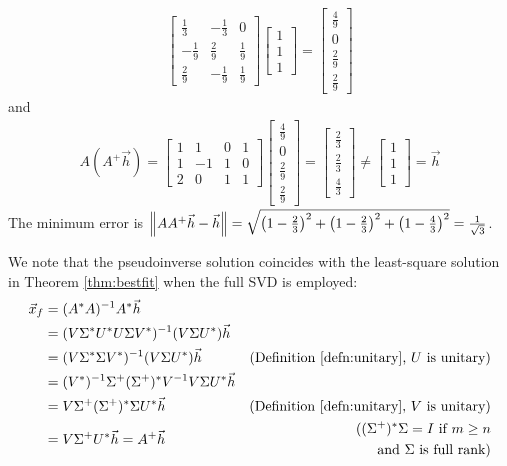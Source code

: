 \begin{solution}
\begin{align*}
\begin{bmatrix}
\frac{1}{3}&-\frac{1}{3}&0\\ 
-\frac{1}{9}&\frac{2}{9}&\frac{1}{9}\\ 
\frac{2}{9}&-\frac{1}{9}&\frac{1}{9}
\end{bmatrix}
\begin{bmatrix}
1 \\
1 \\
1
\end{bmatrix}  
=
\begin{bmatrix}
\frac{4}{9}\\ 
0\\ 
\frac{2}{9}\\ 
\frac{2}{9}
\end{bmatrix}
\end{align*}
and
\begin{align*}
A(A^+\vec{h}) = 
\begin{bmatrix}
1&1&0&1\\ 
1&-1&1&0\\ 
2&0&1&1
\end{bmatrix}
\begin{bmatrix}
\frac{4}{9}\\ 
0\\ 
\frac{2}{9}\\ 
\frac{2}{9}
\end{bmatrix}
=
\begin{bmatrix}
\frac{2}{3} \\
\frac{2}{3} \\
\frac{4}{3}
\end{bmatrix}
\neq 
\begin{bmatrix}
1 \\
1 \\
1
\end{bmatrix} 
= \vec{h}
\end{align*}
The minimum error is $\norm{AA^+\vec{h} - \vec{h}} = \sqrt{\left(1-\frac{2}{3}\right)^2 + \left(1-\frac{2}{3}\right)^2 + \left(1-\frac{4}{3}\right)^2} = \frac{1}{\sqrt{3}}$.
\end{solution}
We note that the pseudoinverse solution coincides with the least-square solution in Theorem \ref{thm:bestfit} when the full SVD is employed:
\begin{align*}
\vec{x}_f &= (A^* A)^{-1}A^* \vec{h} \\
&= (V \Sigma^* U^* U\Sigma V^*)^{-1} (V \Sigma U^*) \vec{h} \\
&= (V \Sigma^* \Sigma V^*)^{-1} (V \Sigma U^*) \vec{h} & \text{(Definition \ref{defn:unitary}, $U$ is unitary)} \\
&= (V^*)^{-1} \Sigma^+ (\Sigma^+)^* V^{-1} V \Sigma U^* \vec{h} \\
&= V \Sigma^+ (\Sigma^+)^* \Sigma U^* \vec{h} & \text{(Definition \ref{defn:unitary}, $V$ is unitary)} \\
&= V {\Sigma^+} U^* \vec{h} = A^+\vec{h} & 
\begin{aligned}
\text{($(\Sigma^+)^* \Sigma = I$ if $m \geq n$} \\ \text{and $\Sigma$ is full rank)} 
\end{aligned}
\end{align*}
